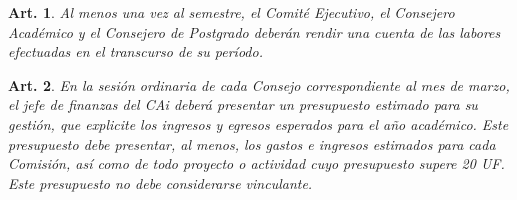 \documentclass[letterpaper,11pt]{article}
\theoremstyle{plain}
\newtheorem{art}{Art.} %
\begin{document}
			\begin{art}\label{cuentasPublicasSemestrales}
				Al menos una vez al semestre, el Comité Ejecutivo, el Consejero Académico y el Consejero de Postgrado deberán rendir una cuenta de las labores efectuadas en el transcurso de su período.
			\end{art}

			\begin{art}\label{presupuestoEjecutivo}
				En la sesión ordinaria de cada Consejo correspondiente al mes de marzo, el jefe de finanzas del CAi deberá presentar un presupuesto estimado para su gestión, que explicite los ingresos y egresos esperados para el año académico. Este presupuesto debe presentar, al menos, los gastos e ingresos estimados para cada Comisión, así como de todo proyecto o actividad cuyo presupuesto supere 20 UF. Este presupuesto no debe considerarse vinculante.
			\end{art}
\end{document}
